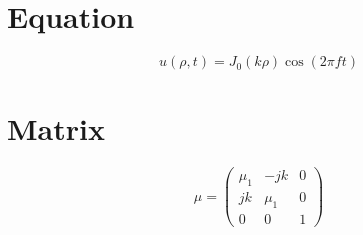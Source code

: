 \documentclass[aspectratio=169]{beamer}
\begin{document}
 \section{Equation}
 \begin{frame}{\secname}
   \centering
   \Huge
   $$
   u(\rho,t) = J_0(k\rho) \cos(2\pi f t)
   $$
 \end{frame}

 \section{Matrix}
 \begin{frame}{\secname}
   \centering
   \Huge
   $$
   \mu = \left(
     \begin{array}{ccc}
       \mu_{1} & -jk & 0 \\
       jk & \mu_{1} & 0 \\
       0 & 0 & 1
     \end{array}
   \right)
   $$
 \end{frame}
\end{document}
